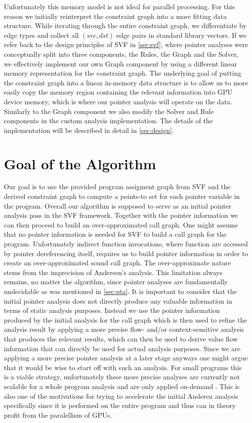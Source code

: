 Unfortunately this memory model is not ideal for parallel processing.
For this reason we initially reinterpret the constraint graph into a more fitting data structure.
While iterating through the entire constraint graph, we differentiate by edge types and collect all $(src,dst)$ edge pairs in standard library vectors.
If we refer back to the design principles of SVF in \autoref{sec:svf}, where pointer analyses were conceptually split into three components, the Rules, the Graph and the Solver, we effectively implement our own Graph component by using a different linear memory representation for the constraint graph. 
The underlying goal of putting the constraint graph into a linear in-memory data structure is to allow us to more easily copy the memory region containing the relevant information into GPU device memory, which is where our pointer analysis will operate on the data.
Similarly to the Graph component we also modify the Solver and Rule components in the custom analysis implementation.
The details of the implementation will be described in detail in \autoref{sec:design}.

\section{Goal of the Algorithm}
Our goal is to use the provided program assigment graph from SVF and the derived constraint graph to compute a points-to set for each pointer variable in the program.
Overall our algorithm is supposed to serve as an initial pointer analysis pass in the SVF framework. Together with the pointer information we can then proceed to build an over-approximated call graph.
One might assume that no pointer information is needed for SVF to build a call graph for the program. Unfortunately indirect function invocations, where function are accessed by pointer dereferencing itself, requires us to build pointer information in order to create an over-approximated sound call graph. The over-approximate nature stems from the imprecision of Andersen's analysis. This limitation always remains, no matter the algorithm, since pointer analyses are fundamentally undecidable as was mentioned in \autoref{sec:pta}.
It is important to consider that the initial pointer analysis does not directly produce any valuable information in terms of static analysis purposes. Instead we use the pointer information produced by the initial analysis for the call graph which is then used to refine the analysis result by applying a more precise flow- and/or context-sensitive analysis that produces the relevant results, which can then be used to derive value flow information that can directly be used for actual analysis purposes.
Since we are applying a more precise pointer analysis at a later stage anyways one might argue that it would be wise to start off with such an analysis. For small programs this is a viable strategy, unfortunately these more precise analyses are currently not scalable for a whole program analysis and are only applied on-demand \cite{sui2016svf}. This is also one of the motivations for trying to accelerate the initial Anderen analysis specifically since it is performed on the entire program and thus can in theory profit from the paralellism of GPUs.

